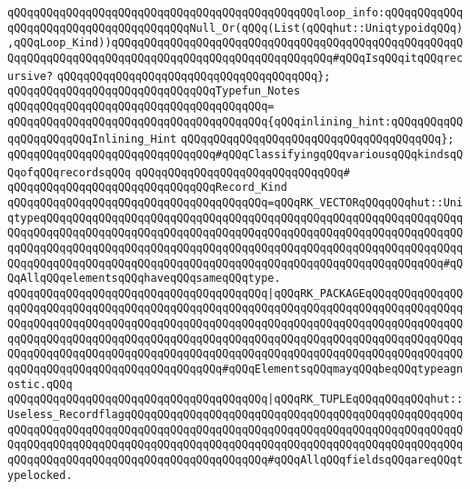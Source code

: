 \verb|qQQqqQQqqQQqqQQqqQQqqQQqqQQqqQQqqQQqqQQqqQQqqQQqloop_info:qQQqqQQqqQQqqQQqqQQqqQQqqQQqqQQqqQQqqQQqNull_Or(qQQq(List(qQQqhut::UniqtypoidqQQq),qQQqLoop_Kind))qQQqqQQqqQQqqQQqqQQqqQQqqQQqqQQqqQQqqQQqqQQqqQQqqQQqqQQqqQQqqQQqqQQqqQQqqQQqqQQqqQQqqQQqqQQqqQQqqQQqqQQq#qQQqIsqQQqitqQQqrecursive?|\newline
\verb|qQQqqQQqqQQqqQQqqQQqqQQqqQQqqQQqqQQqqQQq};|\newline
\newline
\verb|qQQqqQQqqQQqqQQqqQQqqQQqqQQqqQQqTypefun_Notes|\newline
\verb|qQQqqQQqqQQqqQQqqQQqqQQqqQQqqQQqqQQqqQQq=|\newline
\verb|qQQqqQQqqQQqqQQqqQQqqQQqqQQqqQQqqQQqqQQq{qQQqinlining_hint:qQQqqQQqqQQqqQQqqQQqqQQqInlining_Hint|\newline
\verb|qQQqqQQqqQQqqQQqqQQqqQQqqQQqqQQqqQQqqQQq};|\newline
\newline
\verb|qQQqqQQqqQQqqQQqqQQqqQQqqQQqqQQq#qQQqClassifyingqQQqvariousqQQqkindsqQQqofqQQqrecordsqQQq|\newline
\verb|qQQqqQQqqQQqqQQqqQQqqQQqqQQqqQQq#|\newline
\verb|qQQqqQQqqQQqqQQqqQQqqQQqqQQqqQQqRecord_Kind|\newline
\verb|qQQqqQQqqQQqqQQqqQQqqQQqqQQqqQQqqQQqqQQq=qQQqRK_VECTORqQQqqQQqhut::UniqtypeqQQqqQQqqQQqqQQqqQQqqQQqqQQqqQQqqQQqqQQqqQQqqQQqqQQqqQQqqQQqqQQqqQQqqQQqqQQqqQQqqQQqqQQqqQQqqQQqqQQqqQQqqQQqqQQqqQQqqQQqqQQqqQQqqQQqqQQqqQQqqQQqqQQqqQQqqQQqqQQqqQQqqQQqqQQqqQQqqQQqqQQqqQQqqQQqqQQqqQQqqQQqqQQqqQQqqQQqqQQqqQQqqQQqqQQqqQQqqQQqqQQqqQQqqQQqqQQqqQQqqQQqqQQqqQQq#qQQqAllqQQqelementsqQQqhaveqQQqsameqQQqtype.|\newline
\verb|qQQqqQQqqQQqqQQqqQQqqQQqqQQqqQQqqQQqqQQq|\verb#|qQQqRK_PACKAGEqQQqqQQqqQQqqQQqqQQqqQQqqQQqqQQqqQQqqQQqqQQqqQQqqQQqqQQqqQQqqQQqqQQqqQQqqQQqqQQqqQQqqQQqqQQqqQQqqQQqqQQqqQQqqQQqqQQqqQQqqQQqqQQqqQQqqQQqqQQqqQQqqQQqqQQqqQQqqQQqqQQqqQQqqQQqqQQqqQQqqQQqqQQqqQQqqQQqqQQqqQQqqQQqqQQqqQQqqQQqqQQqqQQqqQQqqQQqqQQqqQQqqQQqqQQqqQQqqQQqqQQqqQQqqQQqqQQqqQQqqQQqqQQqqQQqqQQqqQQqqQQqqQQqqQQqqQQqqQQqqQQqqQQq#\verb|#qQQqElementsqQQqmayqQQqbeqQQqtypeagnostic.qQQq|\newline
\verb|qQQqqQQqqQQqqQQqqQQqqQQqqQQqqQQqqQQqqQQq|\verb#|qQQqRK_TUPLEqQQqqQQqqQQqhut::Useless_RecordflagqQQqqQQqqQQqqQQqqQQqqQQqqQQqqQQqqQQqqQQqqQQqqQQqqQQqqQQqqQQqqQQqqQQqqQQqqQQqqQQqqQQqqQQqqQQqqQQqqQQqqQQqqQQqqQQqqQQqqQQqqQQqqQQqqQQqqQQqqQQqqQQqqQQqqQQqqQQqqQQqqQQqqQQqqQQqqQQqqQQqqQQqqQQqqQQqqQQqqQQqqQQqqQQqqQQqqQQqqQQqqQQqqQQqqQQq#\verb|#qQQqAllqQQqfieldsqQQqareqQQqtypelocked.|\newline
